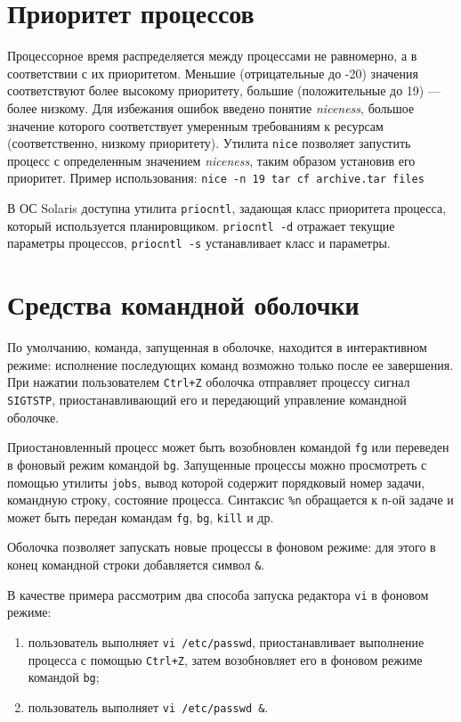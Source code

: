\documentclass[listings]{labreport}
\begin{document}
\section*{Приоритет процессов}

Процессорное время распределяется между процессами не равномерно, а в соответствии с их приоритетом.
Меньшие (отрицательные до -20) значения соответствуют более высокому приоритету, большие (положительные до 19) — более низкому.
Для избежания ошибок введено понятие \textit{niceness}, большое значение которого соответствует умеренным требованиям к ресурсам
(соответственно, низкому приоритету).
Утилита \texttt{nice} позволяет запустить процесс с определенным значением \textit{niceness}, таким образом установив его приоритет.
Пример использования: \texttt{nice -n 19 tar cf archive.tar files}

В ОС Solaris доступна утилита \texttt{priocntl}, задающая класс приоритета процесса, который используется планировщиком.
\texttt{priocntl -d} отражает текущие параметры процессов, \texttt{priocntl -s} устанавливает класс и параметры.

\section*{Средства командной оболочки}

По умолчанию, команда, запущенная в оболочке, находится в интерактивном режиме: исполнение последующих команд возможно только после ее завершения.
При нажатии пользователем \texttt{Ctrl+Z} оболочка отправляет процессу сигнал \texttt{SIGTSTP}, приостанавливающий его и 
передающий управление командной оболочке.

Приостановленный процесс может быть возобновлен командой \texttt{fg} или переведен в фоновый режим командой \texttt{bg}. Запущенные
процессы можно просмотреть с помощью утилиты \texttt{jobs}, вывод которой содержит порядковый номер задачи, командную строку, состояние процесса.
Синтаксис \texttt{\%n} обращается к \texttt{n}-ой задаче и может быть передан командам \texttt{fg}, \texttt{bg}, \texttt{kill} и др.

Оболочка позволяет запускать новые процессы в фоновом режиме: для этого в конец командной строки добавляется символ \texttt{\&}.

В качестве примера рассмотрим два способа запуска редактора \texttt{vi} в фоновом режиме:
\begin{enumerate}
\item пользователь выполняет \texttt{vi /etc/passwd}, приостанавливает выполнение процесса с помощью \texttt{Ctrl+Z},
затем возобновляет его в фоновом режиме командой \texttt{bg};
\item пользователь выполняет \texttt{vi /etc/passwd \&}.
\end{enumerate}
\end{document}
